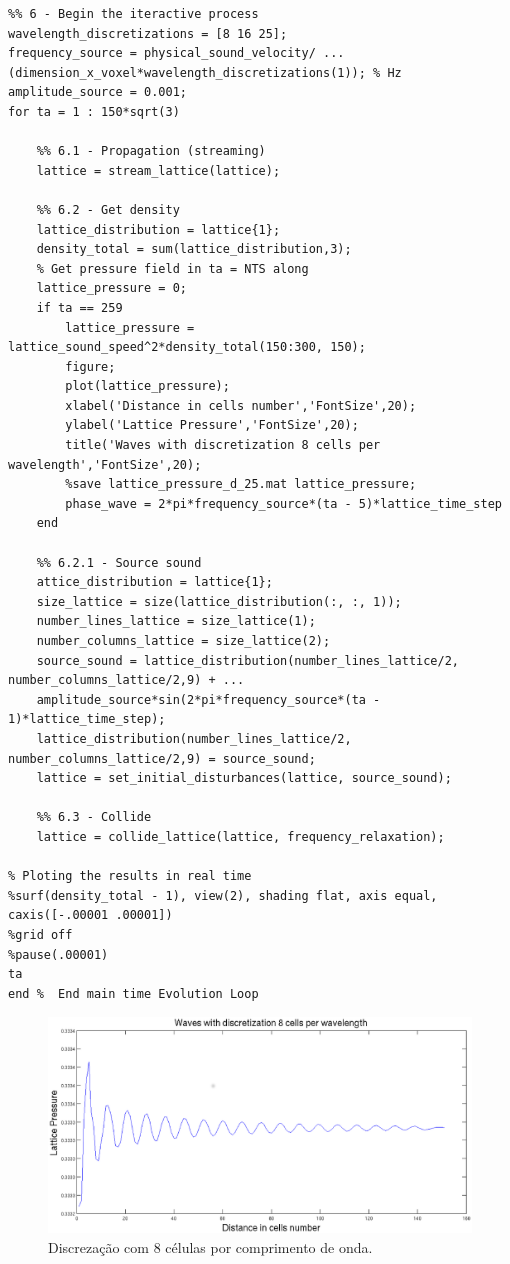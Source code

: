 \begin{lstlisting}
%% 6 - Begin the iteractive process
wavelength_discretizations = [8 16 25];
frequency_source = physical_sound_velocity/ ... 
(dimension_x_voxel*wavelength_discretizations(1)); % Hz
amplitude_source = 0.001;
for ta = 1 : 150*sqrt(3)
    
    %% 6.1 - Propagation (streaming)
    lattice = stream_lattice(lattice);

    %% 6.2 - Get density
    lattice_distribution = lattice{1};
    density_total = sum(lattice_distribution,3);
    % Get pressure field in ta = NTS along
    lattice_pressure = 0;
    if ta == 259
    	lattice_pressure = lattice_sound_speed^2*density_total(150:300, 150);
    	figure;
		plot(lattice_pressure);
		xlabel('Distance in cells number','FontSize',20);
		ylabel('Lattice Pressure','FontSize',20);
		title('Waves with discretization 8 cells per wavelength','FontSize',20);
		%save lattice_pressure_d_25.mat lattice_pressure;
		phase_wave = 2*pi*frequency_source*(ta - 5)*lattice_time_step
    end

    %% 6.2.1 - Source sound
    attice_distribution = lattice{1};
	size_lattice = size(lattice_distribution(:, :, 1));
	number_lines_lattice = size_lattice(1);
	number_columns_lattice = size_lattice(2);
    source_sound = lattice_distribution(number_lines_lattice/2, number_columns_lattice/2,9) + ...
    amplitude_source*sin(2*pi*frequency_source*(ta - 1)*lattice_time_step);
	lattice_distribution(number_lines_lattice/2, number_columns_lattice/2,9) = source_sound;
 	lattice = set_initial_disturbances(lattice, source_sound);

    %% 6.3 - Collide
    lattice = collide_lattice(lattice, frequency_relaxation);
    
% Ploting the results in real time   
%surf(density_total - 1), view(2), shading flat, axis equal, caxis([-.00001 .00001])
%grid off
%pause(.00001)
ta
end %  End main time Evolution Loop
\end{lstlisting}

\begin{figure}[h!]
    \centering
 	\hspace{-2.5cm}
    \includegraphics[width=1.2\textwidth]{figuras/pressure_graph_8_cells_discretization.eps}
    \caption{Discrezação com 8 células por comprimento de onda.}
\end{figure}

